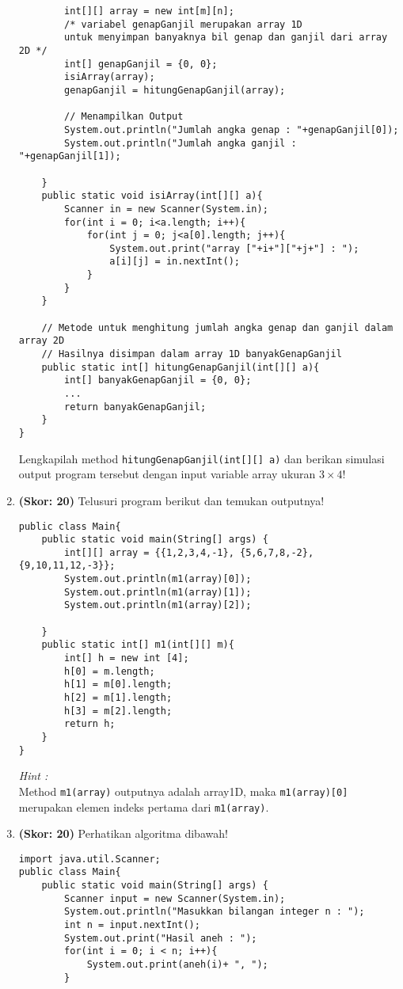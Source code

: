 \documentclass[10pt,openany,a4paper]{article}
\begin{document}
\begin{enumerate}
\begin{verbatim}
	    int[][] array = new int[m][n];
	    /* variabel genapGanjil merupakan array 1D 
	    untuk menyimpan banyaknya bil genap dan ganjil dari array 2D */
	    int[] genapGanjil = {0, 0};
	    isiArray(array);
	    genapGanjil = hitungGenapGanjil(array);
	    
	    // Menampilkan Output
	    System.out.println("Jumlah angka genap : "+genapGanjil[0]);
	    System.out.println("Jumlah angka ganjil : "+genapGanjil[1]);
	    
	}
	public static void isiArray(int[][] a){
	    Scanner in = new Scanner(System.in);
	    for(int i = 0; i<a.length; i++){
	        for(int j = 0; j<a[0].length; j++){
	            System.out.print("array ["+i+"]["+j+"] : ");
	            a[i][j] = in.nextInt();
	        }
	    }
	}
	
	// Metode untuk menghitung jumlah angka genap dan ganjil dalam array 2D
	// Hasilnya disimpan dalam array 1D banyakGenapGanjil
	public static int[] hitungGenapGanjil(int[][] a){
	    int[] banyakGenapGanjil = {0, 0};
	    ...
	    return banyakGenapGanjil;
	}
}
    \end{verbatim}
    Lengkapilah method \texttt{hitungGenapGanjil(int[][] a)} dan berikan simulasi output program tersebut dengan input variable array ukuran $3\times4$!

    \item \textbf{(Skor: 20)} Telusuri program berikut dan temukan outputnya!
    \begin{verbatim}
public class Main{
	public static void main(String[] args) {
	    int[][] array = {{1,2,3,4,-1}, {5,6,7,8,-2}, {9,10,11,12,-3}};
	    System.out.println(m1(array)[0]);
	    System.out.println(m1(array)[1]);
	    System.out.println(m1(array)[2]);
	    
	}
	public static int[] m1(int[][] m){
	    int[] h = new int [4];
	    h[0] = m.length;
	    h[1] = m[0].length;
	    h[2] = m[1].length;
	    h[3] = m[2].length;
	    return h;
	}
}
    \end{verbatim}
\textit{Hint :}\\
Method \texttt{m1(array)} outputnya adalah array1D, maka \texttt{m1(array)[0]} merupakan elemen indeks pertama dari \texttt{m1(array)}.

    \item \textbf{(Skor: 20)} Perhatikan algoritma dibawah!
    \begin{verbatim}
import java.util.Scanner;
public class Main{
	public static void main(String[] args) {
	    Scanner input = new Scanner(System.in);
		System.out.println("Masukkan bilangan integer n : ");
		int n = input.nextInt();
		System.out.print("Hasil aneh : ");
		for(int i = 0; i < n; i++){
		    System.out.print(aneh(i)+ ", ");
		}
		

\end{verbatim}
\end{enumerate}
\end{document}
